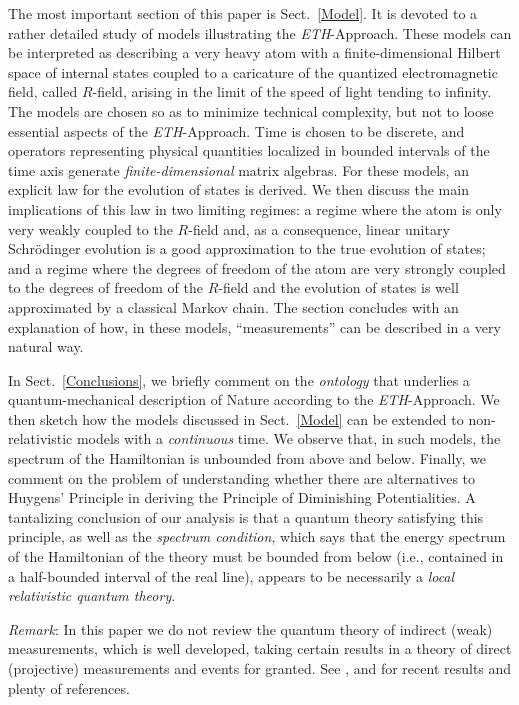 \documentclass[12pt]{article}
\begin{document}
The most important section of this paper is Sect.~\ref{Model}. It is devoted to a rather detailed study of models illustrating 
the \textit{ETH}-Approach. These models can be interpreted as describing a very heavy atom with a finite-dimensional 
Hilbert space of internal states coupled to a caricature of the quantized electromagnetic field, called $R$-field, 
arising in the limit of the speed of light tending to infinity. The models are chosen so as to minimize technical 
complexity, but not to loose essential aspects of the \textit{ETH}-Approach. Time is chosen to be discrete, 
and operators representing physical quantities localized in bounded intervals of the time axis generate 
\textit{finite-dimensional} matrix algebras. For these models, an explicit law for the evolution of states is 
derived. We then discuss the main implications of this law in two limiting regimes: a regime where the atom is only 
very weakly coupled to the $R$-field and, as a consequence, linear unitary Schr\"odinger evolution is a good approximation  
to the true evolution of states; and a regime where the degrees of freedom of the atom are very strongly coupled to the 
degrees of freedom of the $R$-field and the evolution of states is well approximated by a classical Markov chain. 
The section concludes with an explanation of how, in these models, ``measurements'' can be described in a very 
natural way.

In Sect.~\ref{Conclusions}, we briefly comment on the \textit{ontology} that underlies a quantum-mechanical description 
of Nature according to the \textit{ETH}-Approach. We then sketch how the models discussed in Sect.~\ref{Model} can be 
extended to non-relativistic models with a \textit{continuous} time. We observe that, in such models, the spectrum 
of the Hamiltonian is unbounded from above and below. Finally, we comment on the problem of understanding 
whether there are alternatives to Huygens' Principle in deriving the Principle of Diminishing Potentialities. 
A tantalizing conclusion of our analysis is that a quantum theory satisfying this principle, as well as the 
\textit{spectrum condition}, which says that the energy spectrum of the Hamiltonian of the theory must be 
bounded from below (i.e., contained in a half-bounded interval of the real line), appears to be necessarily a 
\textit{local relativistic quantum theory}.

\textit{Remark}: In this paper we do not review the quantum theory of indirect (weak) measurements, which is well developed, 
taking certain results in a theory of direct (projective) measurements and events for granted.
See \cite{M-K}, and \cite{BCJP} for recent  results and plenty of references.
\end{document}
